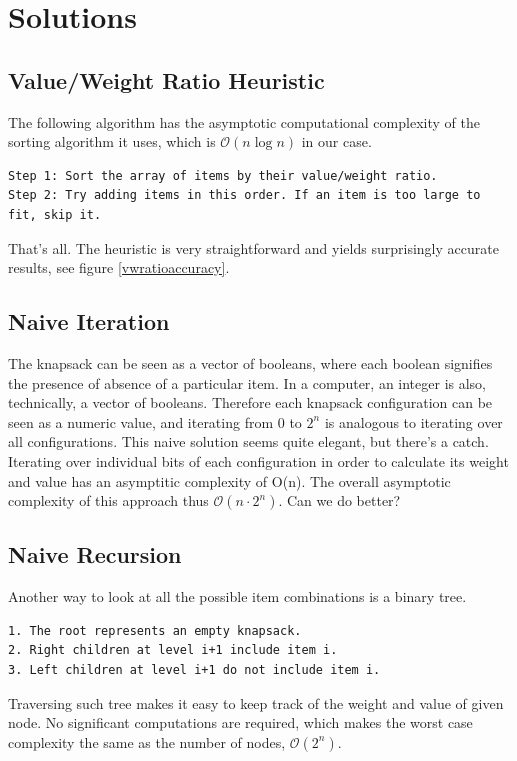 \documentclass[a4paper,10pt,twocolumn]{article}
\begin{document}
\section{Solutions}
\subsection{Value/Weight Ratio Heuristic}
The following algorithm has the asymptotic computational complexity of the sorting algorithm it uses,
which is $\mathcal{O}(n\log{}n)$ in our case.
\begin{lstlisting}
Step 1: Sort the array of items by their value/weight ratio.
Step 2: Try adding items in this order. If an item is too large to fit, skip it.
\end{lstlisting}
That's all. The heuristic is very straightforward and yields surprisingly accurate results, see figure \ref{vwratioaccuracy}.

\subsection{Naive Iteration}
The knapsack can be seen as a vector of booleans, where each boolean signifies the presence of absence of a particular
item. In a computer, an integer is also, technically, a vector of booleans. Therefore each knapsack configuration can be
seen as a numeric value, and iterating from $0$ to $2^n$ is analogous to iterating over all configurations. This naive
solution seems quite elegant, but there's a catch. Iterating over individual bits of each configuration in order to
calculate its weight and value has an asymptitic complexity of O(n). The overall asymptotic complexity of this approach
thus $\mathcal{O}(n\cdot2^n)$. Can we do better?

\subsection{Naive Recursion} \label{naiverec}
Another way to look at all the possible item combinations is a binary tree.
\begin{lstlisting}
1. The root represents an empty knapsack.
2. Right children at level i+1 include item i.
3. Left children at level i+1 do not include item i.
\end{lstlisting}
Traversing such tree makes it easy to keep track of the weight and value of given node. No significant computations are
required, which makes the worst case complexity the same as the number of nodes, $\mathcal{O}(2^n)$.
\end{document}
